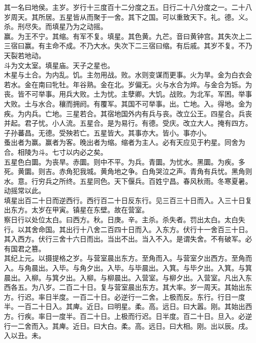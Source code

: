 \documentclass{zhvt-classic}
\begin{document}
\hspace*{2em}其一名曰地侯。主岁。岁行十三度百十二分度之五。日行二十八分度之一。二十八岁周天。其所居。五星皆从而聚于一舍。其下之国。可以重致天下。礼。德。义。杀。刑尽失。而填星乃为之动摇。\\
\hspace*{2em}赢。为王不宁。其缩。有军不复。填星。其色黄。九芒。音曰黄钟宫。其失次上二三宿曰赢。有主命不成。不乃大水。失次下二三宿曰缩。有后戚。其岁不复。不乃天裂若地动。\\
\hspace*{2em}斗为文太室。填星庙。天子之星也。\\
\hspace*{2em}木星与土合。为内乱。饥。主勿用战。败。水则变谋而更事。火为旱。金为白衣会若水。金在南曰牝牡。年谷熟。金在北。岁偏无。火与水合为焠。与金合为铄。为丧。皆不可举事。用兵大败。土为忧。主孽卿。大饥。战败。为北军。军困。举事大败。土与水合。穰而拥阏。有覆军。其国不可举事。出。亡地。入。得地。金为疾。为内兵。亡地。三星若合。其宿地国外内有兵与丧。改立公王。四星合。兵丧并起。君子忧。小人流。五星合。是为易行。有德。受庆。改立大人。掩有四方。子孙蕃昌。无德。受殃若亡。五星皆大。其事亦大。皆小。事亦小。\\
\hspace*{2em}蚤出者为赢。赢者为客。晚出者为缩。缩者为主人。必有天应见于杓星。同舍为合。相陵为斗。七寸以内必之矣。\\
\hspace*{2em}五星色白圜。为丧旱。赤圜。则中不平。为兵。青圜。为忧水。黑圜。为疾。多死。黄圜。则吉。赤角犯我城。黄角地之争。白角哭泣之声。青角有兵忧。黑角则水。意。行穷兵之所终。五星同色。天下偃兵。百姓宁昌。春风秋雨。冬寒夏暑。动摇常以此。\\
\hspace*{2em}填星出百二十日而逆西行。西行百二十日反东行。见三百三十日而入。入三十日复出东方。太岁在甲寅。镇星在东壁。故在营室。\\
\hspace*{2em}察日行以处位太白。曰西方。秋。日庚。辛。主杀。杀失者。罚出太白。太白失行。以其舍命国。其出行十八舍二百四十日而入。入东方。伏行十一舍百三十日。其入西方。伏行三舍十六日而出。当出不出。当入不入。是谓失舍。不有破军。必有国君之篡。\\
\hspace*{2em}其纪上元。以摄提格之岁。与营室晨出东方。至角而入。与营室夕出西方。至角而入。与角晨出。入毕。与角夕出。入毕。与毕晨出。入箕。与毕夕出。入箕。与箕晨出。入柳。与箕夕出。入柳。与柳晨出。入营室。与柳夕出。入营室。凡出入东西各五。为八岁。二百二十日。复与营室晨出东方。其大率。岁一周天。其始出东方。行迟。率日半度。一百二十日。必逆行一二舍。上极而反。东行。行日一度半。一百二十日入。其庳。近日。曰明星。柔。高。远日。曰大嚣。刚。其始出西方。行疾。率日一度半。百二十日。上极而行迟。日半度。百二十日。旦入。必逆行一二舍而入。其庳。近日。曰大白。柔。高。远日。曰大相。刚。出以辰。戌。入以丑。未。\\
\end{document}
